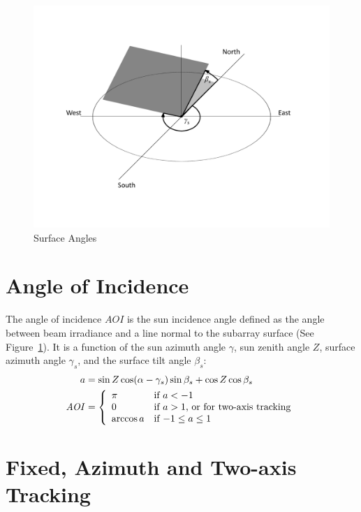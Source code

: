 \documentclass[12pt,letterpaper]{article}
\newcommand\AOI{\ensuremath{\mathit{AOI}}}
\begin{document}
\begin{figure}
\begin{center}
\includegraphics[scale=0.6]{surface-angles}
\caption{Surface Angles}
\label{fig-arrayorientation}
\end{center}
\end{figure}

\section{Angle of Incidence} \label{sec-theta}

The angle of incidence $\AOI$ is the sun incidence angle defined as the angle between beam irradiance and a line normal to the subarray surface (See Figure~\ref{fig-arrayorientation}). It is a function of the sun azimuth angle $\gamma$, sun zenith angle $Z$, surface azimuth angle $\gamma_s$, and the surface tilt angle $\beta_s$:
\begin{align}\label{eqn-inc}
a &= \sin Z \cos(\alpha - \gamma_s) \sin\beta_s + \cos Z \cos\beta_s \notag\\
\AOI &= \left\{
\begin{array}{ll}
\pi & \text{if $a<-1$}\\
0 & \text{if $a>1$, or for two-axis tracking}\\
\arccos a & \text{if $-1 \leq a \leq 1$}
\end{array}
\right.
\end{align}

\section{Fixed, Azimuth and Two-axis Tracking}
\end{document}
